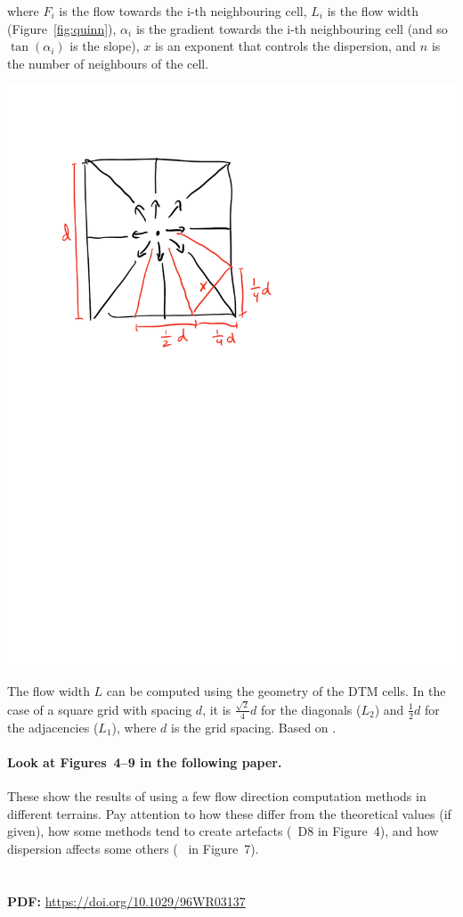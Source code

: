 where \(F_i\) is the flow towards the i-th neighbouring cell, \(L_i\) is the flow width (Figure~\ref{fig:quinn}), \(\alpha_i\) is the gradient towards the i-th neighbouring cell (and so \(\tan(\alpha_i)\) is the slope), \(x\) is an exponent that controls the dispersion, and \(n\) is the number of neighbours of the cell.

\begin{marginfigure}
\centering
\includegraphics[width=\linewidth]{figs/quinn.pdf}
\caption{The flow width \(L\) can be computed using the geometry of the DTM cells.
In the case of a square grid with spacing \(d\), it is \(\frac{\sqrt{2}}{4}d\) for the diagonals (\(L_2\)) and \(\frac{1}{2}d\) for the adjacencies (\(L_1\)), where \(d\) is the grid spacing. Based on \citet{Quinn91}.}%
\label{fig:quinn}
\end{marginfigure}


\begin{kaobox}[frametitle=\faExternalLink\ To read or to watch.]
\paragraph{Look at Figures~4--9 in the following paper.} These show the results of using a few flow direction computation methods in different terrains.
Pay attention to how these differ from the theoretical values (if given), how some methods tend to create artefacts (\eg\ D8 in Figure~4), and how dispersion affects some others (\eg\ \citet{Quinn91} in Figure~7).
\\
\\
\\
\textbf{PDF:} \url{https://doi.org/10.1029/96WR03137}
\end{kaobox}


